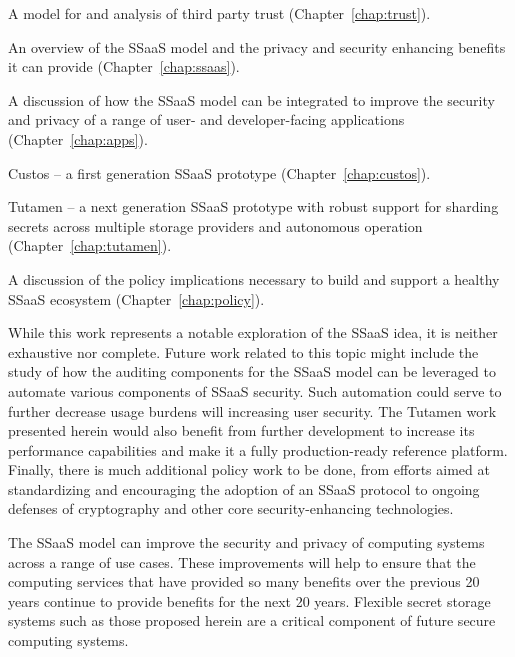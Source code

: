 \begin{packed_item}
\item A model for and analysis of third party trust
  (Chapter~\ref{chap:trust}).
\item An overview of the SSaaS model and the privacy and security
  enhancing benefits it can provide (Chapter~\ref{chap:ssaas}).
\item A discussion of how the SSaaS model can be integrated to improve
  the security and privacy of a range of user- and developer-facing
  applications (Chapter~\ref{chap:apps}).
\item Custos -- a first generation SSaaS prototype
  (Chapter~\ref{chap:custos}).
\item Tutamen -- a next generation SSaaS prototype with robust support
  for sharding secrets across multiple storage providers and
  autonomous operation (Chapter~\ref{chap:tutamen}).
\item A discussion of the policy implications necessary to build and
  support a healthy SSaaS ecosystem (Chapter~\ref{chap:policy}).
\end{packed_item}

While this work represents a notable exploration of the SSaaS idea, it
is neither exhaustive nor complete. Future work related to this topic
might include the study of how the auditing components for the SSaaS
model can be leveraged to automate various components of SSaaS
security. Such automation could serve to further decrease usage
burdens will increasing user security. The Tutamen work presented
herein would also benefit from further development to increase its
performance capabilities and make it a fully production-ready
reference platform. Finally, there is much additional policy work to
be done, from efforts aimed at standardizing and encouraging the
adoption of an SSaaS protocol to ongoing defenses of cryptography and
other core security-enhancing technologies.

The SSaaS model can improve the security and privacy of computing
systems across a range of use cases. These improvements will help to
ensure that the computing services that have provided so many benefits
over the previous 20 years continue to provide benefits for the next
20 years. Flexible secret storage systems such as those proposed
herein are a critical component of future secure computing systems.

